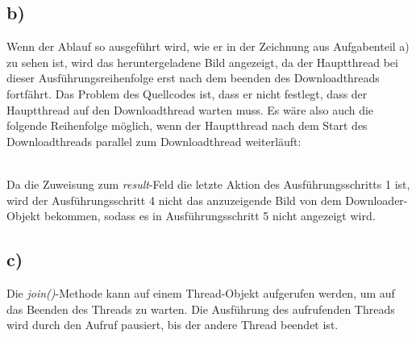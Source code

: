 \documentclass[ngerman]{fbi-aufgabenblatt}
\begin{document}
\subsection*{b)}
Wenn der Ablauf so ausgeführt wird, wie er in der Zeichnung aus Aufgabenteil a) zu sehen ist, wird das heruntergeladene Bild angezeigt, da der Hauptthread bei dieser Ausführungsreihenfolge erst nach dem beenden des Downloadthreads fortfährt. Das Problem des Quellcodes ist, dass er nicht festlegt, dass der Hauptthread auf den Downloadthread warten muss. Es wäre also auch die folgende Reihenfolge möglich, wenn der Hauptthread nach dem Start des Downloadthreads parallel zum Downloadthread weiterläuft: \\

 \\
Da die Zuweisung zum \textit{result}-Feld die letzte Aktion des Ausführungsschritts 1 ist, wird der Ausführungsschritt 4 nicht das anzuzeigende Bild von dem Downloader-Objekt bekommen, sodass es in Ausführungsschritt 5 nicht angezeigt wird.
\subsection*{c)}
Die \textit{join()}-Methode kann auf einem Thread-Objekt aufgerufen werden, um auf das Beenden des Threads zu warten. Die Ausführung des aufrufenden Threads wird durch den Aufruf pausiert, bis der andere Thread beendet ist.
\end{document}
